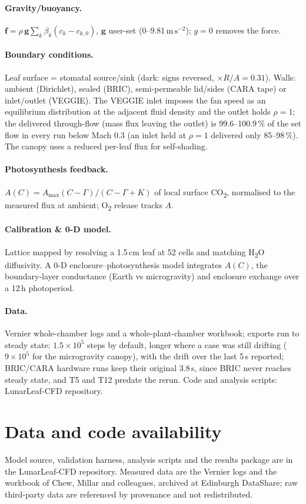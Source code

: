 \documentclass[10pt]{article}
\newcommand{\msq}{\ensuremath{\mathrm{m\,s^{-2}}}}
\newcommand{\co}{CO\textsubscript{2}}
\newcommand{\oo}{O\textsubscript{2}}
\newcommand{\wo}{H\textsubscript{2}O}
\begin{document}
\paragraph{Gravity/buoyancy.} $\mathbf{f}=\rho\,\mathbf{g}\sum_k\beta_k(c_k-c_{k,0})$, $\mathbf{g}$ user-set
(0--9.81\,\msq); $g=0$ removes the force.
\paragraph{Boundary conditions.} Leaf surface = stomatal source/sink (dark: signs reversed, $\times R/A=0.31$). Walls:
ambient (Dirichlet), sealed (BRIC), semi-permeable lid/sides (CARA tape) or inlet/outlet (VEGGIE). The VEGGIE inlet
imposes the fan speed as an equilibrium distribution at the adjacent fluid density and the outlet holds $\rho=1$; the
delivered through-flow (mass flux leaving the outlet) is 99.6--100.9\,\% of the set flow in every run below Mach 0.3
(an inlet held at $\rho=1$ delivered only 85--98\,\%). The canopy uses a reduced per-leaf flux for self-shading.
\paragraph{Photosynthesis feedback.} $A(C)=A_{\max}(C-\Gamma)/(C-\Gamma+K)$ of local surface \co{}, normalised to the
measured flux at ambient; \oo{} release tracks $A$.
\paragraph{Calibration \& 0-D model.} Lattice mapped by resolving a 1.5\,cm leaf at 52 cells and matching \wo{}
diffusivity. A 0-D enclosure--photosynthesis model integrates $A(C)$, the boundary-layer conductance (Earth vs
microgravity) and enclosure exchange over a 12\,h photoperiod.
\paragraph{Data.} Vernier whole-chamber logs and a whole-plant-chamber workbook\citep{chew2022,chew2022data}; exports
run to steady state: $1.5\times10^{5}$ steps by default, longer where a case was still drifting ($9\times10^{5}$ for the microgravity canopy), with the drift over the last 5\,s reported; BRIC/CARA hardware runs keep their original 3.8\,s, since BRIC never reaches steady state, and T5 and T12 predate the rerun. Code and analysis scripts: LunarLeaf-CFD repository.

\section*{Data and code availability}
Model source, validation harness, analysis scripts and the results package are in the LunarLeaf-CFD repository.
Measured data are the Vernier logs and the workbook of Chew, Millar and colleagues\citep{chew2022}, archived at Edinburgh DataShare\citep{chew2022data}; raw third-party data are
referenced by provenance and not redistributed.
\end{document}

